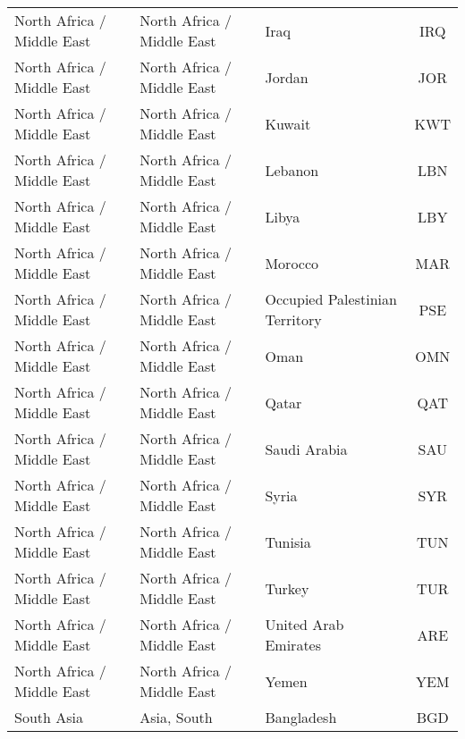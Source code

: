 \begin{longtable}{|p{3cm}|p{3.5cm}|p{5cm}|c|}
    North Africa / Middle East &   North Africa / Middle East &                                              Iraq &  IRQ \\
    North Africa / Middle East &   North Africa / Middle East &                                            Jordan &  JOR \\
    North Africa / Middle East &   North Africa / Middle East &                                            Kuwait &  KWT \\
    North Africa / Middle East &   North Africa / Middle East &                                           Lebanon &  LBN \\
    North Africa / Middle East &   North Africa / Middle East &                                             Libya &  LBY \\
    North Africa / Middle East &   North Africa / Middle East &                                           Morocco &  MAR \\
    North Africa / Middle East &   North Africa / Middle East &                    Occupied Palestinian Territory &  PSE \\
    North Africa / Middle East &   North Africa / Middle East &                                              Oman &  OMN \\
    North Africa / Middle East &   North Africa / Middle East &                                             Qatar &  QAT \\
    North Africa / Middle East &   North Africa / Middle East &                                      Saudi Arabia &  SAU \\
    North Africa / Middle East &   North Africa / Middle East &                                             Syria &  SYR \\
    North Africa / Middle East &   North Africa / Middle East &                                           Tunisia &  TUN \\
    North Africa / Middle East &   North Africa / Middle East &                                            Turkey &  TUR \\
    North Africa / Middle East &   North Africa / Middle East &                              United Arab Emirates &  ARE \\
    North Africa / Middle East &   North Africa / Middle East &                                             Yemen &  YEM \\
                    South Asia &                  Asia, South &                                        Bangladesh &  BGD \\

\end{longtable}
